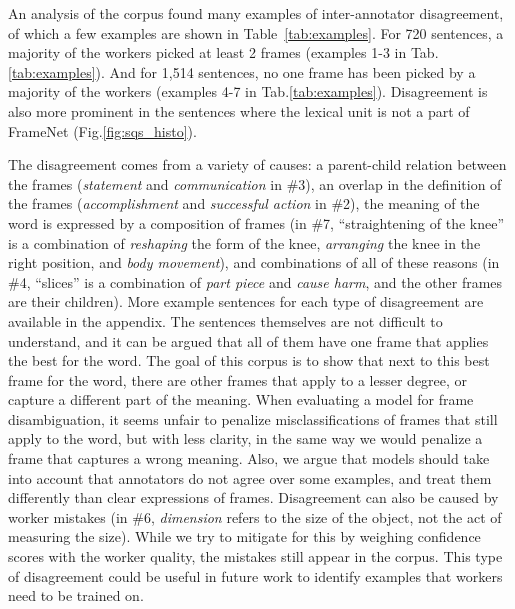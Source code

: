 An analysis of the corpus found many examples of inter-annotator disagreement, of which a few examples are shown in Table~\ref{tab:examples}. For 720 sentences, a majority of the workers picked at least 2 frames (examples 1-3 in Tab.\ref{tab:examples}). And for 1,514 sentences, no one frame has been picked by a majority of the workers (examples 4-7 in Tab.\ref{tab:examples}). Disagreement is also more prominent in the sentences where the lexical unit is not a part of FrameNet (Fig.\ref{fig:sqs_histo}).

The disagreement comes from a variety of causes: a parent-child relation between the frames (\textit{statement} and \textit{communication} in \#3), an overlap in the definition of the frames (\textit{accomplishment} and \textit{successful action} in \#2), the meaning of the word is expressed by a composition of frames (in \#7, ``straightening of the knee'' is a combination of \textit{reshaping} the form of the knee, \textit{arranging} the knee in the right position, and \textit{body movement}), and combinations of all of these reasons (in \#4, ``slices'' is a combination of \textit{part piece} and \textit{cause harm}, and the other frames are their children). More example sentences for each type of disagreement are available in the appendix. The sentences themselves are not difficult to understand, and it can be argued that all of them have one frame that applies the best for the word. The goal of this corpus is to show that next to this best frame for the word, there are other frames that apply to a lesser degree, or capture a different part of the meaning. When evaluating a model for frame disambiguation, it seems unfair to penalize misclassifications of frames that still apply to the word, but with less clarity, in the same way we would penalize a frame that captures a wrong meaning. Also, we argue that models should take into account that annotators do not agree over some examples, and treat them differently than clear expressions of frames. Disagreement can also be caused by worker mistakes (in \#6, \textit{dimension} refers to the size of the object, not the act of measuring the size). While we try to mitigate for this by weighing confidence scores with the worker quality, the mistakes still appear in the corpus. This type of disagreement could be useful in future work to identify examples that workers need to be trained on.


